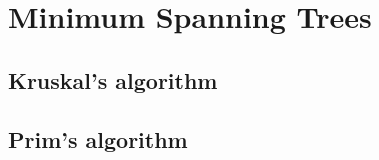 \chapter{Minimum Spanning Trees}
\label{chap:mst}

\section{Kruskal's algorithm}

\section{Prim's algorithm}